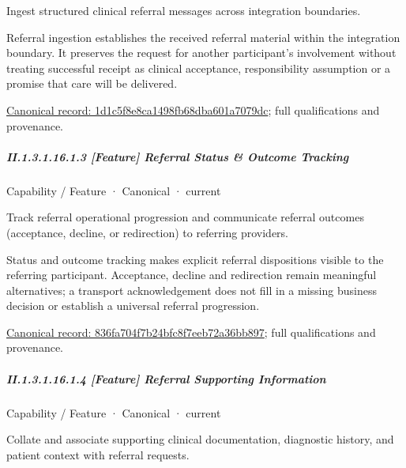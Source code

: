 Ingest structured clinical referral messages across integration boundaries.



Referral ingestion establishes the received referral material within the integration boundary. It preserves the request for another participant's involvement without treating successful receipt as clinical acceptance, responsibility assumption or a promise that care will be delivered.


{\footnotesize \href{../../../../continuum/strategy/capability/feature/1d1c5f8e8ca1498fb68dba601a7079dc.md}{Canonical record: 1d1c5f8e8ca1498fb68dba601a7079dc}; full qualifications and provenance.}\par
\subparagraph*{II.1.3.1.16.1.3 [Feature] Referral Status \& Outcome Tracking}
\label{navigation:II.1.3.1.16.1.3}

\label{element:836fa704f7b24bfc8f7eeb72a36bb897}
{\small Capability / Feature · Canonical · current}\par

Track referral operational progression and communicate referral outcomes (acceptance, decline, or redirection) to referring providers.



Status and outcome tracking makes explicit referral dispositions visible to the referring participant. Acceptance, decline and redirection remain meaningful alternatives; a transport acknowledgement does not fill in a missing business decision or establish a universal referral progression.


{\footnotesize \href{../../../../continuum/strategy/capability/feature/836fa704f7b24bfc8f7eeb72a36bb897.md}{Canonical record: 836fa704f7b24bfc8f7eeb72a36bb897}; full qualifications and provenance.}\par
\subparagraph*{II.1.3.1.16.1.4 [Feature] Referral Supporting Information}
\label{navigation:II.1.3.1.16.1.4}

\label{element:c8a50c0e932847d7b7d0289101aacd98}
{\small Capability / Feature · Canonical · current}\par

Collate and associate supporting clinical documentation, diagnostic history, and patient context with referral requests.



